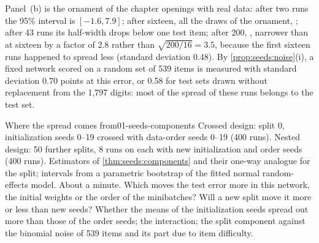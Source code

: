 \begin{refsection}
Panel~(b) is the ornament of the chapter openings with real data: after two runs the 95\% interval is $[-1.6,7.9]$; after sixteen, all the draws of the ornament, ; after 43 runs its half-width drops below one test item; after 200, , narrower than at sixteen by a factor of 2.8 rather than $\sqrt{200/16}=3.5$, because the first sixteen runs happened to spread less (standard deviation 0.48). By \cref{prop:seeds:noise}(i), a fixed network scored on a random set of 539 items is measured with standard deviation 0.70 points at this error, or 0.58 for test sets drawn without replacement from the 1,797 digits: most of the spread of these runs belongs to the test set.

\begin{lab}{Where the spread comes from}{01-seeds-components}\label{lab:seeds:components}
 Crossed design: split 0, initialization seeds 0--19 crossed with data-order seeds 0--19 (400 runs). Nested design: 50 further splits, 8 runs on each with new initialization and order seeds (400 runs). Estimators of \cref{thm:seeds:components} and their one-way analogue for the split; intervals from a parametric bootstrap of the fitted normal random-effects model. About a minute.
 Which moves the test error more in this network, the initial weights or the order of the minibatches? Will a new split move it more or less than new seeds?
 Whether the means of the initialization seeds spread out more than those of the order seeds; the interaction; the split component against the binomial noise of 539 items and its part due to item difficulty.
\end{lab}


\end{refsection}
